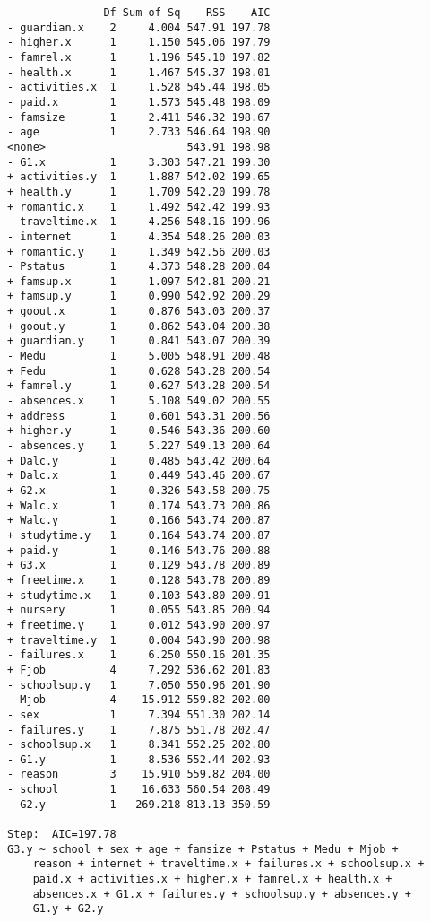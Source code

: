 \documentclass[11pt]{article}
\begin{document}
\begin{enumerate}
\begin{verbatim}
               Df Sum of Sq    RSS    AIC
- guardian.x    2     4.004 547.91 197.78
- higher.x      1     1.150 545.06 197.79
- famrel.x      1     1.196 545.10 197.82
- health.x      1     1.467 545.37 198.01
- activities.x  1     1.528 545.44 198.05
- paid.x        1     1.573 545.48 198.09
- famsize       1     2.411 546.32 198.67
- age           1     2.733 546.64 198.90
<none>                      543.91 198.98
- G1.x          1     3.303 547.21 199.30
+ activities.y  1     1.887 542.02 199.65
+ health.y      1     1.709 542.20 199.78
+ romantic.x    1     1.492 542.42 199.93
- traveltime.x  1     4.256 548.16 199.96
- internet      1     4.354 548.26 200.03
+ romantic.y    1     1.349 542.56 200.03
- Pstatus       1     4.373 548.28 200.04
+ famsup.x      1     1.097 542.81 200.21
+ famsup.y      1     0.990 542.92 200.29
+ goout.x       1     0.876 543.03 200.37
+ goout.y       1     0.862 543.04 200.38
+ guardian.y    1     0.841 543.07 200.39
- Medu          1     5.005 548.91 200.48
+ Fedu          1     0.628 543.28 200.54
+ famrel.y      1     0.627 543.28 200.54
- absences.x    1     5.108 549.02 200.55
+ address       1     0.601 543.31 200.56
+ higher.y      1     0.546 543.36 200.60
- absences.y    1     5.227 549.13 200.64
+ Dalc.y        1     0.485 543.42 200.64
+ Dalc.x        1     0.449 543.46 200.67
+ G2.x          1     0.326 543.58 200.75
+ Walc.x        1     0.174 543.73 200.86
+ Walc.y        1     0.166 543.74 200.87
+ studytime.y   1     0.164 543.74 200.87
+ paid.y        1     0.146 543.76 200.88
+ G3.x          1     0.129 543.78 200.89
+ freetime.x    1     0.128 543.78 200.89
+ studytime.x   1     0.103 543.80 200.91
+ nursery       1     0.055 543.85 200.94
+ freetime.y    1     0.012 543.90 200.97
+ traveltime.y  1     0.004 543.90 200.98
- failures.x    1     6.250 550.16 201.35
+ Fjob          4     7.292 536.62 201.83
- schoolsup.y   1     7.050 550.96 201.90
- Mjob          4    15.912 559.82 202.00
- sex           1     7.394 551.30 202.14
- failures.y    1     7.875 551.78 202.47
- schoolsup.x   1     8.341 552.25 202.80
- G1.y          1     8.536 552.44 202.93
- reason        3    15.910 559.82 204.00
- school        1    16.633 560.54 208.49
- G2.y          1   269.218 813.13 350.59

Step:  AIC=197.78
G3.y ~ school + sex + age + famsize + Pstatus + Medu + Mjob + 
    reason + internet + traveltime.x + failures.x + schoolsup.x + 
    paid.x + activities.x + higher.x + famrel.x + health.x + 
    absences.x + G1.x + failures.y + schoolsup.y + absences.y + 
    G1.y + G2.y


\end{verbatim}
\end{enumerate}
\end{document}
